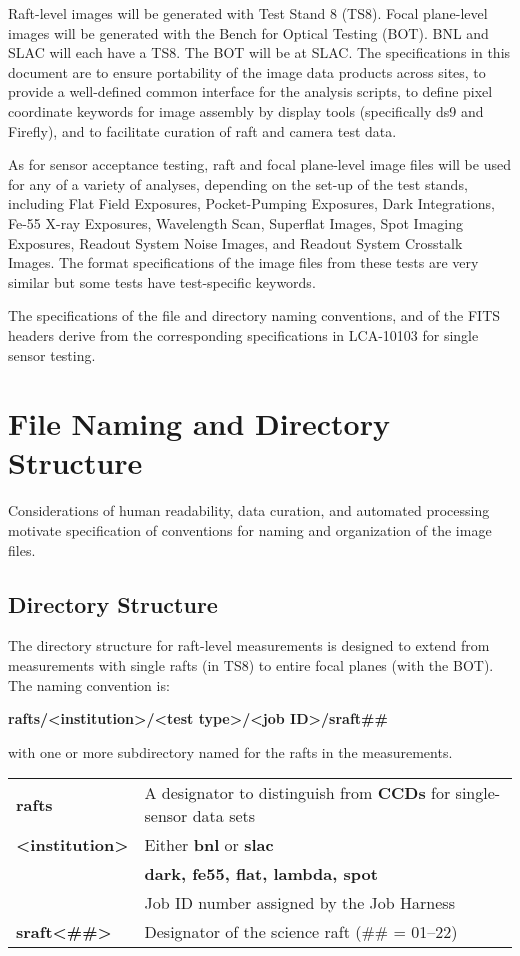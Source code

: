 \documentclass{article}[12pt]
\begin{document}
Raft-level images will be generated with Test Stand 8 (TS8).  Focal plane-level images will be generated with the Bench for Optical Testing (BOT).  BNL and SLAC will each have a TS8.  The BOT will be at SLAC.  The specifications in this document are to ensure portability of the image data products across sites, to provide a well-defined common interface for the analysis scripts, to define pixel coordinate keywords for image assembly by display tools (specifically ds9 and Firefly), and to facilitate curation of raft and camera test data.

As for sensor acceptance testing, raft and focal plane-level image files will be used for any of a variety of analyses, depending on the set-up of the test stands, including Flat Field Exposures, Pocket-Pumping Exposures, Dark Integrations, Fe-55 X-ray Exposures, Wavelength Scan, Superflat Images, Spot Imaging Exposures, Readout System Noise Images, and Readout System Crosstalk Images.
The format specifications of the image files from these tests are very similar but some tests have test-specific keywords.  

The specifications of the file and directory naming conventions, and of the FITS headers derive from the corresponding specifications in LCA-10103 for single sensor testing.

\section{File Naming and Directory Structure}
Considerations of human readability, data curation, and automated processing motivate specification of conventions for naming and organization of the image files.

\subsection{Directory Structure}

The directory structure for raft-level measurements is designed to extend from measurements with single rafts (in TS8) to entire focal planes (with the BOT).  The naming convention is:

{\bf rafts/<institution>/<test type>/<job ID>/sraft\#\#}

with one or more subdirectory named for the rafts in the measurements.  

\begin{tabular}{| l | l |}
\hline
{\bf rafts} & A designator to distinguish from {\bf CCDs} for single-sensor data sets \\
{\bf <institution>} & Either {\bf bnl} or {\bf slac} \\
{\bf <test type>} & {\bf dark, fe55, flat, lambda, spot} \\
{\bf <job ID>} & Job ID number assigned by the Job Harness \\
{\bf sraft<\#\#>} & Designator of the science raft (\#\# = 01--22) \\
\hline
\end{tabular}
\end{document}
